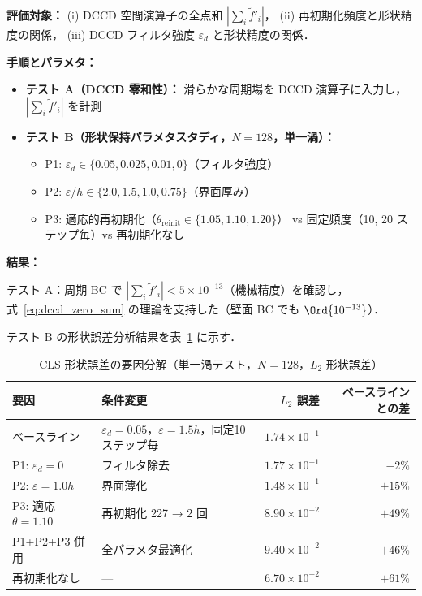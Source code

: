 \noindent\textbf{評価対象：}
(i) DCCD 空間演算子の全点和 $|\sum_i \tilde{f}'_i|$，
(ii) 再初期化頻度と形状精度の関係，
(iii) DCCD フィルタ強度 $\varepsilon_d$ と形状精度の関係．

\noindent\textbf{手順とパラメタ：}
\begin{itemize}[noitemsep]
  \item \textbf{テスト A（DCCD 零和性）：}
        滑らかな周期場を DCCD 演算子に入力し，$|\sum_i \tilde{f}'_i|$ を計測
  \item \textbf{テスト B（形状保持パラメタスタディ，$N = 128$，単一渦）：}
        \begin{itemize}[noitemsep]
          \item P1: $\varepsilon_d \in \{0.05, 0.025, 0.01, 0\}$（フィルタ強度）
          \item P2: $\varepsilon/h \in \{2.0, 1.5, 1.0, 0.75\}$（界面厚み）
          \item P3: 適応的再初期化（$\theta_{\mathrm{reinit}} \in \{1.05, 1.10, 1.20\}$）
                vs 固定頻度（10, 20 ステップ毎）vs 再初期化なし
        \end{itemize}
\end{itemize}

\noindent\textbf{結果：}

テスト A：周期 BC で $|\sum_i \tilde{f}'_i| < 5 \times 10^{-13}$（機械精度）を確認し，
式~\eqref{eq:dccd_zero_sum} の理論を支持した（壁面 BC でも $\Ord{10^{-13}}$）．

テスト B の形状誤差分析結果を表~\ref{tab:shape_hierarchy} に示す．

\begin{table}[htbp]
\centering
\caption{CLS 形状誤差の要因分解（単一渦テスト，$N = 128$，$L_2$ 形状誤差）}
\label{tab:shape_hierarchy}
\renewcommand{\arraystretch}{1.3}
\begin{tabular}{llrr}
\toprule
要因 & 条件変更 & $L_2$ 誤差 & ベースラインとの差 \\
\midrule
ベースライン & $\varepsilon_d = 0.05$，$\varepsilon = 1.5h$，固定10ステップ毎
  & $1.74 \times 10^{-1}$ & --- \\
\midrule
P1: $\varepsilon_d = 0$ & フィルタ除去
  & $1.77 \times 10^{-1}$ & $-2\%$ \\
P2: $\varepsilon = 1.0h$ & 界面薄化
  & $1.48 \times 10^{-1}$ & $+15\%$ \\
P3: 適応 $\theta = 1.10$ & 再初期化 227 → 2 回
  & $8.90 \times 10^{-2}$ & $+49\%$ \\
P1+P2+P3 併用 & 全パラメタ最適化
  & $9.40 \times 10^{-2}$ & $+46\%$ \\
再初期化なし & ---
  & $6.70 \times 10^{-2}$ & $+61\%$ \\
\bottomrule
\end{tabular}
\end{table}

